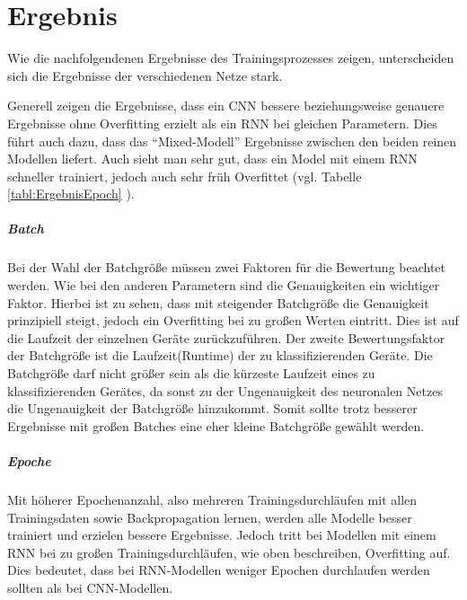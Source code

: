 \chapter{Ergebnis}\label{Ergebnis}

    Wie die nachfolgendenen Ergebnisse des Trainingsprozesses zeigen, unterscheiden sich die Ergebnisse der verschiedenen Netze stark.

    Generell zeigen die Ergebnisse, dass ein \ac{CNN} bessere beziehungsweise genauere Ergebnisse ohne Overfitting erzielt als ein \ac{RNN} bei gleichen Parametern.
    Dies führt auch dazu, dass das "`Mixed-Modell"' Ergebnisse zwischen den beiden reinen Modellen liefert.
    Auch sieht man sehr gut, dass ein Model mit einem \ac{RNN} schneller trainiert, jedoch auch sehr früh Overfittet (vgl. Tabelle \ref{tabl:ErgebnisEpoch} ).
    
    \paragraph{Batch} 
    Bei der Wahl der Batchgröße müssen zwei Faktoren für die Bewertung beachtet werden. 
    Wie bei den anderen Parametern sind die Genauigkeiten ein wichtiger Faktor. 
    Hierbei ist zu sehen, dass mit steigender Batchgröße die Genauigkeit prinzipiell steigt, jedoch ein Overfitting bei zu großen Werten eintritt.
    Dies ist auf die Laufzeit der einzelnen Geräte zurückzuführen.
    Der zweite Bewertungsfaktor der Batchgröße ist die Laufzeit(Runtime) der zu klassifizierenden Geräte. 
    Die Batchgröße darf nicht größer sein als die kürzeste Laufzeit eines zu klassifizierenden Gerätes, da sonst zu der Ungenauigkeit des neuronalen Netzes die Ungenauigkeit der Batchgröße hinzukommt. %
    Somit sollte trotz besserer Ergebnisse mit großen Batches eine eher kleine Batchgröße gewählt werden.

    \paragraph{Epoche} 
    Mit höherer Epochenanzahl, also mehreren Trainingsdurchläufen mit allen Trainingsdaten sowie Backpropagation lernen, werden alle Modelle besser trainiert und erzielen bessere Ergebnisse.
    Jedoch tritt bei Modellen mit einem \ac{RNN} bei zu großen Trainingsdurchläufen, wie oben beschreiben, Overfitting auf.
    Dies bedeutet, dass bei \ac{RNN}-Modellen weniger Epochen durchlaufen werden sollten als bei \ac{CNN}-Modellen.

